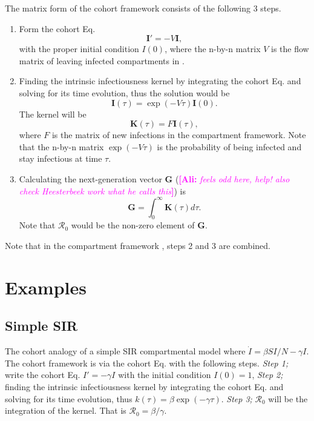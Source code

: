 \documentclass[12pt]{article}
\newcommand{\ali}[1]{\comment{magenta}{Ali}{#1}}
\newcommand{\R}{\ensuremath{\mathcal{R}_0}}
\renewcommand{\vec}[1]{\ensuremath{\mathbf{#1}}} %
\newcommand{\comment}{\showcomment}
\newcommand{\showcomment}[3]{\textcolor{#1}{\textbf{[#2: }\textsl{#3}\textbf{]}}}
\theoremstyle{definition} %
\begin{document}
The matrix form of the cohort framework consists of the following 3 steps.
\begin{enumerate}[{\it Step 1.}]
\item
Form the cohort Eq. 
\begin{equation}
\label{eq:cohort}
\vec I'=-V \vec I,
\end{equation}
 with the proper initial condition $I(0)$, where the n-by-n matrix $V$ is the flow matrix of leaving infected compartments in \cite{van2002reproduction}.

\item 
Finding the intrinsic infectiousness kernel by integrating the cohort Eq. and solving for its time evolution, thus
the solution would be 
\begin{equation}
\label{eq:I}
\vec I(\tau) = \exp(-V\tau) \vec I(0).
\end{equation}
The kernel will be 
\begin{equation}
\label{eq:kernel}
\vec K(\tau) = F \vec I(\tau), 
\end{equation}
where $F$ is the matrix of new infections in the compartment framework.
Note that the n-by-n matrix $\exp(-V\tau)$ is the probability of being infected and stay infectious at time $\tau$. 

\item
Calculating the next-generation vector $\vec G$ (\ali{feels odd here, help! also check Heesterbeek work what he calls this}) is
\begin{equation}
\label{eq:ng} %
\vec G = \int_0^\infty \vec K(\tau) d\tau.
\end{equation}
Note that $\R$ would be the non-zero element of $\vec G$.
\end{enumerate}
Note that in the compartment framework \citep{van2002reproduction}, steps 2 and 3 are combined.
\section{Examples}

\subsection {Simple SIR}
The cohort analogy of a simple SIR compartmental model where $\dot I=\beta S I/N-\gamma I$. The cohort framework is via the cohort Eq. with the following steps.
{\it Step 1;} write the cohort Eq. $I'=-\gamma I$ with the initial condition $I(0)=1$, 
{\it Step 2;} finding the intrinsic infectiousness kernel by integrating the cohort Eq. and solving for its time evolution, thus $k(\tau)=\beta \exp(-\gamma \tau)$.
{\it Step 3;} $\R$ will be the integration of the kernel. That is $\R=\beta/\gamma$. 
\end{document}
